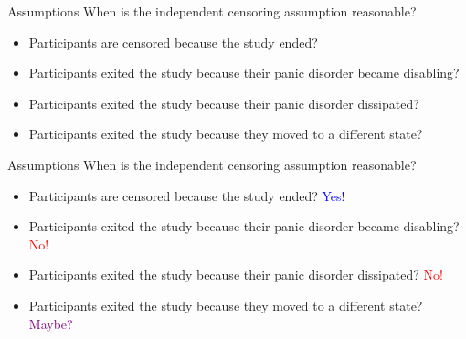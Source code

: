 \documentclass[10pt,t]{beamer}
\begin{document}
\begin{frame}{Assumptions}
	When is the independent censoring assumption reasonable? 
	
	\medskip
	
	\begin{itemize}
		\item Participants are censored because the study ended?   
		
		\medskip
		
		\item Participants exited the study because their panic disorder became disabling?  
		
		\medskip
		
		\item Participants exited the study because their panic disorder dissipated?  
		
		\medskip
		
		\item Participants exited the study because they moved to a different state?   
	\end{itemize}

\end{frame}


\begin{frame}{Assumptions}
	When is the independent censoring assumption reasonable? 
	
	\medskip
	
	\begin{itemize}
		\item Participants are censored because the study ended?   \textcolor{blue}{Yes!}
		
		\medskip
		
		\item Participants exited the study because their panic disorder became disabling?   \textcolor{red}{No!}
		
		\medskip
		
		\item Participants exited the study because their panic disorder dissipated?   \textcolor{red}{No!}
		
		\medskip
		
		\item Participants exited the study because they moved to a different state?   \textcolor{purple}{Maybe?}
	\end{itemize}
	
\end{frame}
\end{document}
